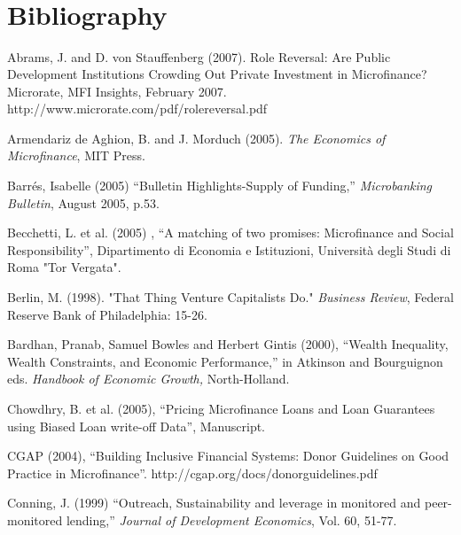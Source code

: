 \documentclass[
]{article}
\begin{document}
\hypertarget{section}{%
\section{}\label{section}}

\hypertarget{section-1}{%
\section{\texorpdfstring{\\
}{ }}\label{section-1}}

\hypertarget{bibliography}{%
\section{Bibliography}\label{bibliography}}

Abrams, J. and D. von Stauffenberg (2007). Role Reversal: Are Public
Development Institutions Crowding Out Private Investment in
Microfinance? Microrate, MFI Insights, February 2007.
http://www.microrate.com/pdf/rolereversal.pdf

Armendariz de Aghion, B. and J. Morduch (2005). \emph{The Economics of
Microfinance}, MIT Press.

Barrés, Isabelle (2005) ``Bulletin Highlights-Supply of Funding,''
\emph{Microbanking Bulletin}, August 2005, p.53.

Becchetti, L. et al. (2005) , ``A matching of two promises: Microfinance
and Social Responsibility'', Dipartimento di Economia e Istituzioni,
Università degli Studi di Roma "Tor Vergata".

Berlin, M. (1998). "That Thing Venture Capitalists Do." \emph{Business
Review}, Federal Reserve Bank of Philadelphia: 15-26.

Bardhan, Pranab, Samuel Bowles and Herbert Gintis (2000), ``Wealth
Inequality, Wealth Constraints, and Economic Performance,'' in Atkinson
and Bourguignon eds. \emph{Handbook of Economic Growth,} North-Holland.

Chowdhry, B. et al. (2005), ``Pricing Microfinance Loans and Loan
Guarantees using Biased Loan write-off Data'', Manuscript.

CGAP (2004), ``Building Inclusive Financial Systems: Donor Guidelines on
Good Practice in Microfinance''.
http://cgap.org/docs/donorguidelines.pdf

Conning, J. (1999) ``Outreach, Sustainability and leverage in monitored
and peer-monitored lending,'' \emph{Journal of Development Economics},
Vol. 60, 51-77.
\end{document}
